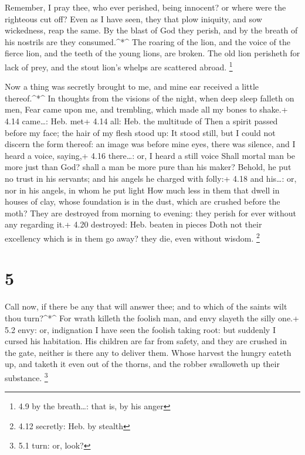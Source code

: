  Remember, I pray thee, who ever perished, being innocent?
or where were the righteous cut off?  Even as I have seen,
they that plow iniquity, and sow wickedness, reap the same. 
By the blast of God they perish, and by the breath of his nostrils are
they consumed.\^{}*\^{}  The roaring of the lion, and the
voice of the fierce lion, and the teeth of the young lions, are broken.
 The old lion perisheth for lack of prey, and the stout
lion's whelps are scattered abroad. \footnote{4.9 by the breath\ldots:
  that is, by his anger}

 Now a thing was secretly brought to me, and mine ear
received a little thereof.\^{}*\^{}  In thoughts from the
visions of the night, when deep sleep falleth on men,  Fear
came upon me, and trembling, which made all my bones to shake.+ 4.14
came\ldots: Heb. met+ 4.14 all: Heb. the multitude of  Then
a spirit passed before my face; the hair of my flesh stood up:
 It stood still, but I could not discern the form thereof:
an image was before mine eyes, there was silence, and I heard a voice,
saying,+ 4.16 there\ldots: or, I heard a still voice  Shall
mortal man be more just than God? shall a man be more pure than his
maker?  Behold, he put no trust in his servants; and his
angels he charged with folly:+ 4.18 and his\ldots: or, nor in his
angels, in whom he put light  How much less in them that
dwell in houses of clay, whose foundation is in the dust, which are
crushed before the moth?  They are destroyed from morning
to evening: they perish for ever without any regarding it.+ 4.20
destroyed: Heb. beaten in pieces  Doth not their excellency
which is in them go away? they die, even without wisdom. \footnote{4.12
  secretly: Heb. by stealth}

\hypertarget{section-4}{%
\section{5}\label{section-4}}

 Call now, if there be any that will answer thee; and to
which of the saints wilt thou turn?\^{}*\^{}  For wrath
killeth the foolish man, and envy slayeth the silly one.+ 5.2 envy: or,
indignation  I have seen the foolish taking root: but
suddenly I cursed his habitation.  His children are far from
safety, and they are crushed in the gate, neither is there any to
deliver them.  Whose harvest the hungry eateth up, and
taketh it even out of the thorns, and the robber swalloweth up their
substance. \footnote{5.1 turn: or, look?}

